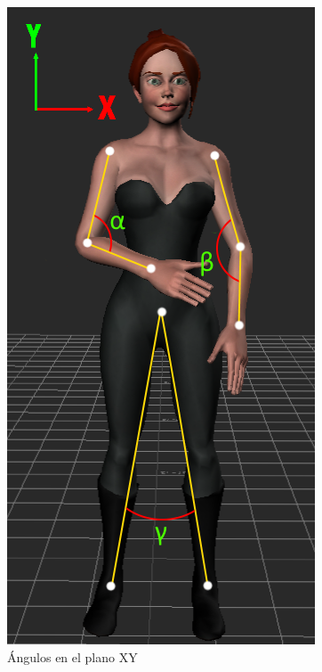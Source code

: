 \begin{figure}[H]%
	\begin{center}
		\includegraphics[scale=0.45]{./Figuras/Implementacion/AngulosXY}
	\end{center}
	\caption{Ángulos en el plano XY}
	\label{fig:AngulosXY}
\end{figure}

